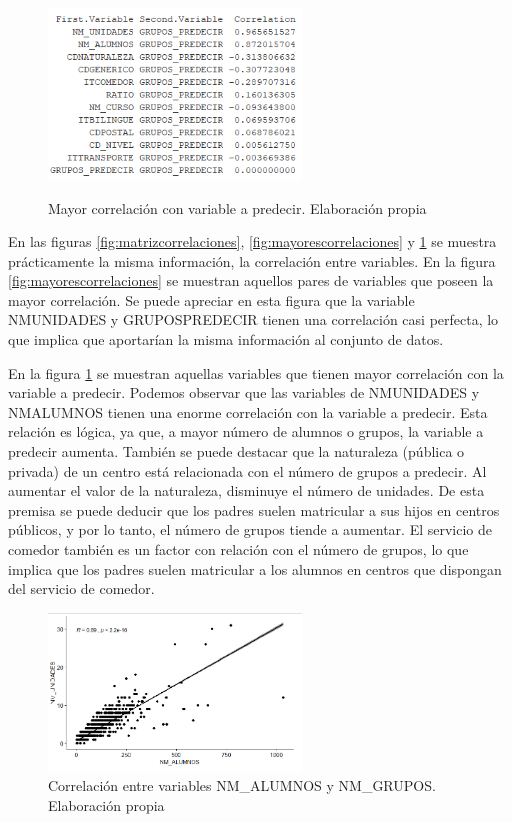 \begin{subappendices}
\begin{figure}[htb]
	\centering
	\caption{Mayor correlación con variable a predecir. Elaboración propia}
	\includegraphics[width=0.6\textwidth]{recursos/ImagenesR/mayorcorrelacion}
	\label{fig:mayorcorrelacionpredecir}
\end{figure}
\FloatBarrier
En las figuras \ref{fig:matrizcorrelaciones}, \ref{fig:mayorescorrelaciones} y \ref{fig:mayorcorrelacionpredecir} se muestra prácticamente la misma información, la correlación entre variables. En la figura \ref{fig:mayorescorrelaciones} se muestran aquellos pares de variables que poseen la mayor correlación. Se puede apreciar en esta figura que la variable NMUNIDADES y GRUPOSPREDECIR tienen una correlación casi perfecta, lo que implica que aportarían la misma información al conjunto de datos.

En la figura \ref{fig:mayorcorrelacionpredecir} se muestran aquellas variables que tienen mayor correlación con la variable a predecir. Podemos observar que las variables de NMUNIDADES y NMALUMNOS tienen una enorme correlación con la variable a predecir. Esta relación es lógica, ya que, a mayor número de alumnos o grupos, la variable a predecir aumenta. También se puede destacar que la naturaleza (pública o privada) de un centro está relacionada con el número de grupos a predecir. Al aumentar el valor de la naturaleza, disminuye el número de unidades. De esta premisa se puede deducir que los padres suelen matricular a sus hijos en centros públicos, y por lo tanto, el número de grupos tiende a aumentar. El servicio de comedor también es un factor con relación con el número de grupos, lo que implica que los padres suelen matricular a los alumnos en centros que dispongan del servicio de comedor.

\begin{figure}[htb]
	\centering
	\caption{Correlación entre variables NM\_ALUMNOS y NM\_GRUPOS. Elaboración propia}
	\label{fig:relacionAlumnGrup}
	\includegraphics[width=0.6\textwidth]{recursos/ImagenesR/RelacionAlumnGrupos}
	

\end{figure}
\end{subappendices}
